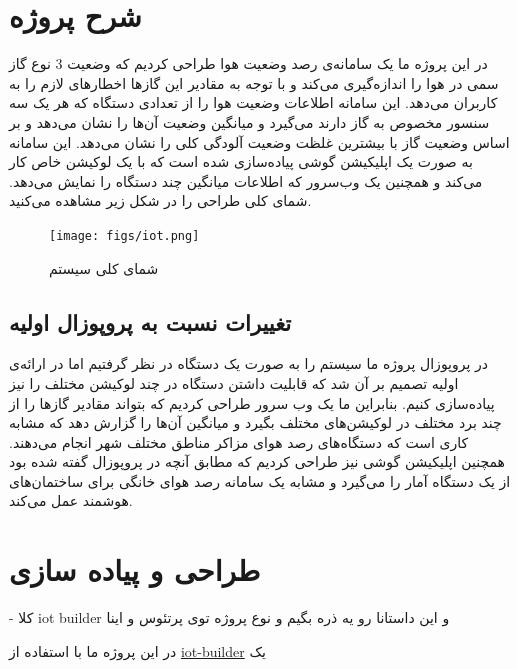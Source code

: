 \section{شرح پروژه}
در این پروژه ما یک سامانه‌ی 
رصد وضعیت هوا طراحی کردیم که وضعیت 3 نوع گاز سمی در هوا را اندازه‌‌گیری می‌کند و با توجه به مقادیر این گاز‌ها اخطار‌های لازم را به کاربران می‌دهد. این سامانه اطلاعات وضعیت هوا را از تعدادی دستگاه که هر یک سه سنسور مخصوص به گاز ‌دارند می‌گیرد و میانگین وضعیت آن‌ها را نشان می‌دهد و بر اساس وضعیت گاز با بیشترین غلظت وضعیت آلودگی کلی را نشان می‌دهد. این سامانه به صورت یک اپلیکیشن گوشی پیاده‌سازی شده است که با یک لوکیشن خاص کار می‌کند و همچنین یک وب‌سرور که اطلاعات میانگین چند دستگاه را نمایش می‌دهد. شمای کلی طراحی را در شکل زیر مشاهده می‌کنید. 
\begin{figure}[h!]
	\centering		
 	\texttt{[image: figs/iot.png]}
	\caption{شمای کلی سیستم}
\end{figure}


\subsection{تغییرات نسبت به پروپوزال اولیه}
در پروپوزال پروژه ما سیستم را به صورت یک دستگاه در نظر گرفتیم اما در ارائه‌ی اولیه تصمیم بر آن شد که قابلیت داشتن دستگاه در چند لوکیشن مختلف را نیز پیاده‌سازی کنیم. بنابراین ما یک وب سرور طراحی کردیم که بتواند مقادیر گاز‌ها را از چند برد مختلف در لوکیشن‌های مختلف بگیرد و میانگین آن‌ها را گزارش دهد که مشابه کاری است که دستگاه‌های رصد هوای مزاکر مناطق مختلف شهر انجام می‌دهند. همچنین اپلیکیشن گوشی نیز طراحی کردیم که مطابق آنچه در پروپوزال گفته شده بود از یک دستگاه آمار را می‌گیرد و مشابه یک سامانه رصد هوای خانگی برای ساختمان‌های هوشمند عمل می‌کند.  

\section{طراحی و پیاده سازی}
- کلا iot builder و این داستانا رو یه ذره بگیم و نوع پروژه توی پرتئوس و اینا

در این پروژه ما با استفاده از 
\href{https://labcenter.s3.amazonaws.com/downloads/iotHelp.pdf}{iot-builder}
یک 
